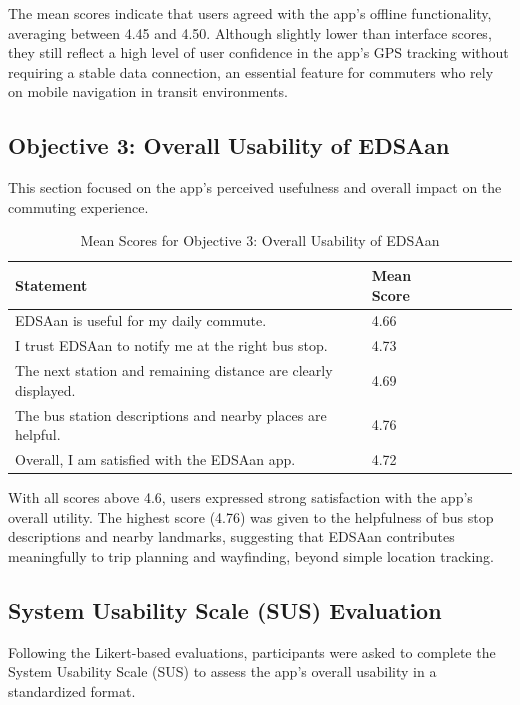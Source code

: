 \documentclass{icsthesis}
\begin{document}
\begin{mainmatter}
The mean scores indicate that users agreed with the app’s offline functionality, averaging between 4.45 and 4.50. Although slightly lower than interface scores, they still reflect a high level of user confidence in the app’s GPS tracking without requiring a stable data connection, an essential feature for commuters who rely on mobile navigation in transit environments.

\subsection{Objective 3: Overall Usability of EDSAan}
This section focused on the app’s perceived usefulness and overall impact on the commuting experience.

			\begin{table}[ht]
			\vspace{4ex}
			\centering
				\caption{Mean Scores for Objective 3: Overall Usability of EDSAan}
				
				\label{table:Mean Scores for Objective 3: Overall Usability of EDSAan}
				\begin{tabular}{llllll}
				\hline
				\hline
				Statement & Mean Score \\ \hline
				EDSAan is useful for my daily commute. & 4.66 \\
				I trust EDSAan to notify me at the right bus stop. & 4.73 \\
				The next station and remaining distance are clearly displayed. & 4.69 \\
                The bus station descriptions and nearby places are helpful. & 4.76 \\
                Overall, I am satisfied with the EDSAan app. & 4.72 \\
                \hline\hline
				\end{tabular} 
			\vspace{4ex}
			\end{table}

With all scores above 4.6, users expressed strong satisfaction with the app's overall utility. The highest score (4.76) was given to the helpfulness of bus stop descriptions and nearby landmarks, suggesting that EDSAan contributes meaningfully to trip planning and wayfinding, beyond simple location tracking.

\subsection{System Usability Scale (SUS) Evaluation}
Following the Likert-based evaluations, participants were asked to complete the System Usability Scale (SUS) to assess the app’s overall usability in a standardized format.


\end{mainmatter}
\end{document}
